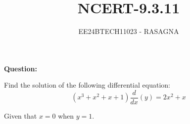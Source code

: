 \documentclass[journal]{IEEEtran}
\begin{document}

\vspace{3cm}

\title{NCERT-9.3.11}
\author{EE24BTECH11023 - RASAGNA}

{\let\newpage\relax\maketitle}

\renewcommand{\thefigure}{\theenumi}
\renewcommand{\thetable}{\theenumi}
\setlength{\intextsep}{10pt} %


\renewcommand{\thetable}{\theenumi}
\textbf{Question:}

Find the solution of the following differential equation:
$$
(x^3 + x^2 + x + 1) \frac{d}{dx}(y) = 2x^2 + x
$$
\begin{center}
    Given that $x = 0$ when $y = 1$.
\end{center}
\end{document}
